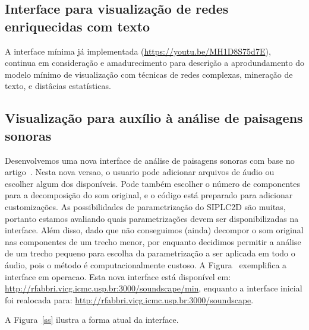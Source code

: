 \documentclass[a4paper, 11pt]{article}
\begin{document}
\subsection{Interface para visualização de redes enriquecidas com texto}
A interface mínima já implementada (\url{https://youtu.be/MH1D8S75d7E}),
continua em consideração e amadurecimento para descrição a aprodundamento
do modelo mínimo de visualização com técnicas de redes complexas, mineração
de texto, e distâcias estatísticas.

\subsection{Visualização para auxílio à análise de paisagens sonoras}\label{pa}
Desenvolvemos uma nova interface de análise de paisagens sonoras com base no
artigo~\cite{eld}.  
Nesta nova versao, o usuario pode adicionar arquivos de áudio ou escolher algum dos disponíveis.
Pode também escolher o número de componentes para a decomposição do som original,
e o código está preparado para adicionar customizações.
As possibilidades de parametrização do SIPLC2D são muitas, portanto estamos avaliando quais
parametrizações devem ser disponibilizadas na interface.
Além disso, dado que não conseguimos (ainda) decompor o som original nas componentes de um
trecho menor, por enquanto decidimos permitir a análise de um trecho pequeno para escolha da
parametrização a ser aplicada em todo o áudio, pois o método é computacionalmente custoso.
A Figura~\cite{ps} exemplifica a interface em operacao.
Esta nova interface está disponível em: \url{http://rfabbri.vicg.icmc.usp.br:3000/soundscape/min},
enquanto a interface inicial foi realocada para: \url{http://rfabbri.vicg.icmc.usp.br:3000/soundscape}.

A Figura~\ref{ss} ilustra a forma atual da interface.
\end{document}
